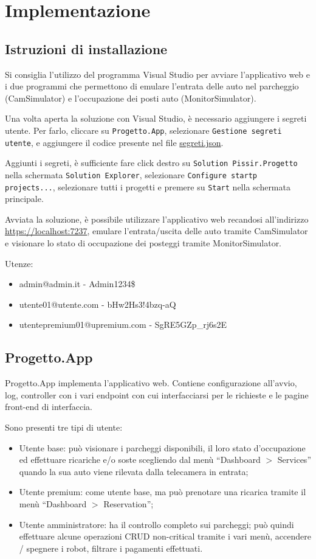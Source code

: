 \documentclass{article}
\begin{document}
\section{Implementazione}
\subsection{Istruzioni di installazione}
Si consiglia l'utilizzo del programma Visual Studio per avviare l'applicativo web e i due programmi che permettono di emulare l'entrata delle auto nel parcheggio (CamSimulator) e l'occupazione dei posti auto (MonitorSimulator).

Una volta aperta la soluzione con Visual Studio, è necessario aggiungere i segreti utente. Per farlo, cliccare su \texttt{Progetto.App}, selezionare \texttt{Gestione segreti utente}, e aggiungere il codice presente nel file \href{run:./segreti.json}{segreti.json}.

Aggiunti i segreti, è sufficiente fare click destro su \texttt{Solution Pissir.Progetto} nella schermata \texttt{Solution Explorer}, selezionare \texttt{Configure startp projects...}, selezionare tutti i progetti e premere su \texttt{Start} nella schermata principale.

Avviata la soluzione, è possibile utilizzare l'applicativo web recandosi all'indirizzo \url{https://localhost:7237}, emulare l'entrata/uscita delle auto tramite CamSimulator e visionare lo stato di occupazione dei posteggi tramite MonitorSimulator.

Utenze:
\begin{itemize}
    \item admin@admin.it - Admin1234\$ 
    \item utente01@utente.com - bHw2Hs3!4bzq-aQ
    \item utentepremium01@upremium.com - SgRE5GZp\_rj6s2E
\end{itemize}
\subsection{Progetto.App}
Progetto.App implementa l'applicativo web. Contiene configurazione all'avvio, log, controller con i vari endpoint con cui interfacciarsi per le richieste e le pagine front-end di interfaccia.

Sono presenti tre tipi di utente:
\begin{itemize}
    \item Utente base: può visionare i parcheggi disponibili, il loro stato d'occupazione ed effettuare ricariche e/o soste scegliendo dal menù “Dashboard $>$ Services” quando la sua auto viene rilevata dalla telecamera in entrata;
    \item Utente premium: come utente base, ma può prenotare una ricarica tramite il menù
    “Dashboard $>$ Reservation”;
    \item Utente amministratore: ha il controllo completo sui parcheggi; può quindi effettuare alcune operazioni CRUD non-critical tramite i vari menù, accendere / spegnere i robot, filtrare i pagamenti effettuati.
\end{itemize}
\end{document}
